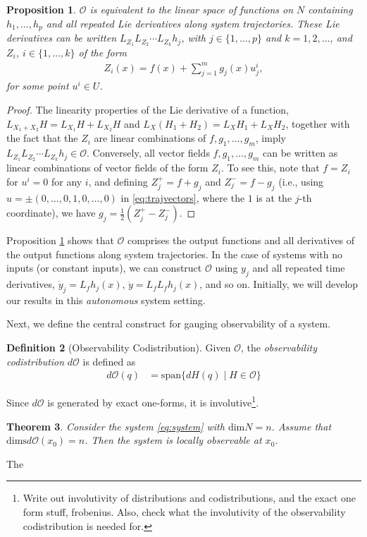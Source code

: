 \documentclass[psamsfonts]{amsart}
\newtheorem{thm}{Theorem}[section]
\newtheorem{prop}[thm]{Proposition}
\theoremstyle{definition}
\newtheorem{defn}[thm]{Definition}
\theoremstyle{remark}
\numberwithin{equation}{section}
\begin{document}
\begin{prop}\label{prop:O-space-equiv}
$\mathscr{O}$ is equivalent to the linear space of functions on $N$ containing $h_1, \dots, h_p$ and all repeated Lie derivatives along system trajectories. These Lie derivatives can be written $L_{Z_1}L_{Z_2}\cdots L_{Z_k}h_j$, with $j \in \{1, \dots, p\}$ and $k=1, 2, \dots$, and $Z_i$, $i\in \{1, \dots, k\}$ of the form
\begin{align}\label{eq:trajvectors}
Z_i(x) = f(x) + \sum_{j = 1}^{m}g_j(x)u_j^i,
\end{align} 
for some point $u^i \in U$. 
\end{prop}
\begin{proof}
The linearity properties of the Lie derivative of a function, $L_{X_1+X_2}H = L_{X_1}H+L_{X_2}H$ and $L_X(H_1+H_2) = L_XH_1 + L_XH_2$, together with the fact that the $Z_i$ are linear combinations of $f, g_1, \dots, g_m$, imply $L_{Z_1}L_{Z_2}\cdots L_{Z_k}h_j \in \mathscr{O}$. Conversely, all vector fields $f, g_1, \dots, g_m$ can be written as linear combinations of vector fields of the form $Z_i$. To see this, note that $f = Z_i$ for $u^i = 0$ for any $i$, and defining $Z_{j}^{+} = f+g_j$ and $Z_{j}^{-} = f-g_j$ (i.e., using $u = \pm (0, \dots, 0, 1, 0, \dots, 0)$ in \eqref{eq:trajvectors}, where the $1$ is at the $j$-th coordinate), we have $g_j = \frac{1}{2}(Z_{j}^{+}-Z_{j}^{-})$.  
\end{proof}

Proposition \ref{prop:O-space-equiv} shows that $\mathscr{O}$ comprises the output functions and all derivatives of the output functions along system trajectories. In the case of systems with no inputs (or constant inputs), we can construct $\mathscr{O}$ using $y_j$ and all repeated time derivatives, $\dot y_j = L_fh_j(x)$, $\ddot y = L_fL_fh_j(x)$, and so on. Initially, we will develop our results in this \textit{autonomous} system setting. 

Next, we define the central construct for gauging observability of a system. 
\begin{defn}[Observability Codistribution]
Given $\mathscr{O}$, the \textit{observability codistribution} $d\mathscr{O}$ is defined as
\begin{align}
d\mathscr{O}(q) & = {} \text{span}\{d H(q) \mid H \in \mathscr{O}\}
\end{align}
\end{defn}
Since $d\mathscr{O}$ is generated by exact one-forms, {\color{red}it is involutive}\footnote{{\color{red}Write out involutivity of distributions and codistributions, and the exact one form stuff, frobenius. Also, check what the involutivity of the observability codistribution is needed for.}}. 

\begin{thm}
Consider the system \ref{eq:system} with $\text{dim}N = n$. Assume that $\text{dims}d\mathscr{O}(x_0) = n$. Then the system is locally observable at $x_0$.  
\end{thm}
The 



\end{document}
